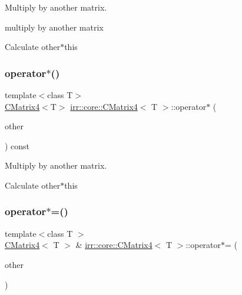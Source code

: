 Multiply by another matrix. 

multiply by another matrix

Calculate other$\ast$this \mbox{\label{classirr_1_1core_1_1CMatrix4_a749eaef2610aa636e50c28aaad8fe075}} 
\subsubsection{\texorpdfstring{operator$\ast$()}{operator*()}\hspace{0.1cm}{\footnotesize\ttfamily [2/2]}}
{\footnotesize\ttfamily template$<$class T$>$ \\
\hyperlink{classirr_1_1core_1_1CMatrix4}{C\+Matrix4}$<$T$>$ \hyperlink{classirr_1_1core_1_1CMatrix4}{irr\+::core\+::\+C\+Matrix4}$<$ T $>$\+::operator$\ast$ (\begin{DoxyParamCaption}\item[{const \hyperlink{classirr_1_1core_1_1CMatrix4}{C\+Matrix4}$<$ T $>$ \&}]{other }\end{DoxyParamCaption}) const}



Multiply by another matrix. 

Calculate other$\ast$this \mbox{\label{classirr_1_1core_1_1CMatrix4_ac3d29f86c91d9d095ab155ecb8870f87}} 
\subsubsection{\texorpdfstring{operator$\ast$=()}{operator*=()}\hspace{0.1cm}{\footnotesize\ttfamily [1/2]}}
{\footnotesize\ttfamily template$<$class T $>$ \\
\hyperlink{classirr_1_1core_1_1CMatrix4}{C\+Matrix4}$<$ T $>$ \& \hyperlink{classirr_1_1core_1_1CMatrix4}{irr\+::core\+::\+C\+Matrix4}$<$ T $>$\+::operator$\ast$= (\begin{DoxyParamCaption}\item[{const \hyperlink{classirr_1_1core_1_1CMatrix4}{C\+Matrix4}$<$ T $>$ \&}]{other }\end{DoxyParamCaption})\hspace{0.3cm}{\ttfamily [inline]}}



